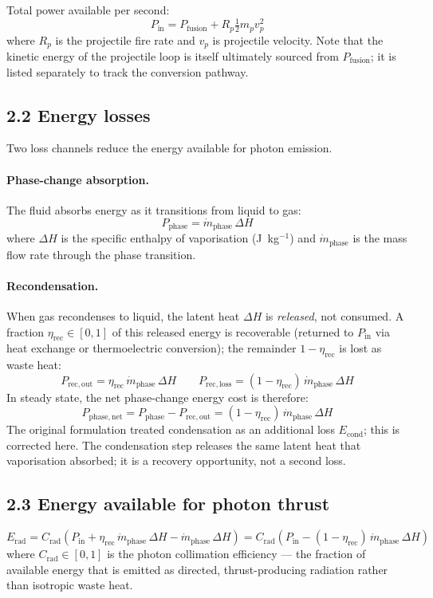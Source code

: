 \documentclass[12pt]{article}
\begin{document}
Total power available per second:
\[
  P_{\mathrm{in}} = P_{\mathrm{fusion}} + R_p \tfrac{1}{2} m_p v_p^2
\]
where $R_p$ is the projectile fire rate and $v_p$ is projectile velocity.
Note that the kinetic energy of the projectile loop is itself ultimately sourced
from $P_{\mathrm{fusion}}$; it is listed separately to track the conversion pathway.

\subsection*{2.2 Energy losses}

Two loss channels reduce the energy available for photon emission.

\paragraph{Phase-change absorption.}
The fluid absorbs energy as it transitions from liquid to gas:
\[
  P_{\mathrm{phase}} = \dot{m}_{\mathrm{phase}}\,\Delta H
\]
where $\Delta H$ is the specific enthalpy of vaporisation (J~kg$^{-1}$) and
$\dot{m}_{\mathrm{phase}}$ is the mass flow rate through the phase transition.

\paragraph{Recondensation.}
When gas recondenses to liquid, the latent heat $\Delta H$ is \emph{released},
not consumed. A fraction $\eta_{\mathrm{rec}} \in [0,1]$ of this released energy
is recoverable (returned to $P_{\mathrm{in}}$ via heat exchange or
thermoelectric conversion); the remainder $1 - \eta_{\mathrm{rec}}$ is lost as
waste heat:
\[
  P_{\mathrm{rec,out}} = \eta_{\mathrm{rec}}\,\dot{m}_{\mathrm{phase}}\,\Delta H
  \qquad
  P_{\mathrm{rec,loss}} = (1 - \eta_{\mathrm{rec}})\,\dot{m}_{\mathrm{phase}}\,\Delta H
\]
In steady state, the net phase-change energy cost is therefore:
\[
  P_{\mathrm{phase,net}} = P_{\mathrm{phase}} - P_{\mathrm{rec,out}}
  = (1 - \eta_{\mathrm{rec}})\,\dot{m}_{\mathrm{phase}}\,\Delta H
\]
The original formulation treated condensation as an additional loss $E_{\mathrm{cond}}$;
this is corrected here. The condensation step releases the same latent heat that
vaporisation absorbed; it is a recovery opportunity, not a second loss.

\subsection*{2.3 Energy available for photon thrust}
\[
  \boxed{
  E_{\mathrm{rad}} = C_{\mathrm{rad}}\!\left(
    P_{\mathrm{in}}
    + \eta_{\mathrm{rec}}\,\dot{m}_{\mathrm{phase}}\,\Delta H
    - \dot{m}_{\mathrm{phase}}\,\Delta H
  \right)
  = C_{\mathrm{rad}}\!\left(
    P_{\mathrm{in}}
    - (1-\eta_{\mathrm{rec}})\,\dot{m}_{\mathrm{phase}}\,\Delta H
  \right)
  }
\]
where $C_{\mathrm{rad}} \in [0,1]$ is the photon collimation efficiency — the
fraction of available energy that is emitted as directed, thrust-producing radiation
rather than isotropic waste heat.
\end{document}
